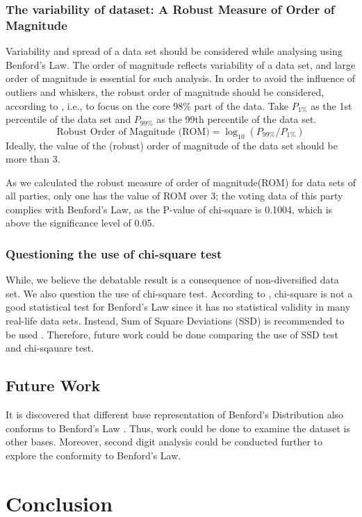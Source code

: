 \documentclass[12pt]{article}
\begin{document}
\subsubsection{The variability of dataset: A Robust Measure of Order of Magnitude}


Variability and spread of a data set should be considered while analysing using Benford's Law. The order of magnitude reflects variability of a data set, and large order of magnitude is essential for such analysis. In order to avoid the influence of outliers and  whiskers, the robust order of magnitude should be considered, according to \cite{alex}, i.e., to focus on the core 98\% part of the data. Take $P_{1\%}$ as the 1st percentile of the data set and $P_{99\%}$ as the 99th percentile of the data set. $$\text{Robust Order of Magnitude (ROM)} = \log_{10}(P_{99\%}/P_{1\%})$$ Ideally, the value of the (robust) order of magnitude of the data set should be more than 3.

As we calculated the robust measure of order of magnitude(ROM) for data sets of all parties, only one has the value of ROM over 3; the voting data of this party complies with Benford’s Law, as the P-value of chi-square is 0.1004, which is above the significance level of 0.05. 

\subsubsection {Questioning the use of chi-square test}
While, we believe the debatable result is a consequence of non-diversified data set. We also question the use of chi-square test. According to \textcite{alex}, chi-square is not a good statistical test for Benford's Law since it has no statistical validity in many real-life data sets. Instead, Sum of Square Deviations (SSD) is recommended to be used \cite{alex}. Therefore, future work could be done comparing the use of SSD test and chi-sqauare test.

\subsection{Future Work}
It is discovered that different base representation of Benford's Distribution also conforms to Benford's Law \cite{SCHATTE1998391}. Thus, work could be done to examine the dataset is other bases. Moreover, second digit analysis could be conducted further to explore the conformity to Benford's Law.

\section{Conclusion}
\end{document}

